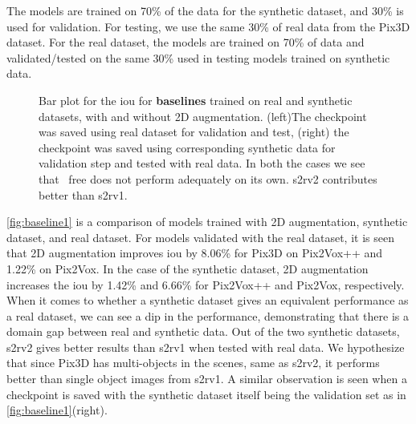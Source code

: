 The models are trained on 70\% of the data for the synthetic dataset, and 30\% is used for validation.
For testing, we use the same 30\% of real data from the Pix3D dataset.
For the real dataset, the models are trained on 70\% of data and validated/tested on the same 30\% used in testing models trained on synthetic data.

\begin{figure}[ht]
    \centering
    \resizebox{0.49\linewidth}{0.5\linewidth}{}
    \resizebox{0.49\linewidth}{0.5\linewidth}{}
    \caption{Bar plot for the \gls{iou}  for \textbf{baselines} trained on real and synthetic datasets, with and without 2D augmentation.
        (left)The checkpoint was saved using real dataset for validation and test, (right) the checkpoint was saved using corresponding synthetic data for validation step and tested with real data.
        In both the cases we see that ~\gls{free} does not perform adequately on its own. \gls{s2rv2} contributes better than \gls{s2rv1}.}
    \label{fig:baseline1}
\end{figure}

\autoref{fig:baseline1} is a comparison of models trained with 2D augmentation, synthetic dataset, and real dataset.
For models validated with the real dataset, it is seen that 2D augmentation improves \gls{iou}  by 8.06\% for Pix3D on Pix2Vox++ and 1.22\% on Pix2Vox.
In the case of the synthetic dataset, 2D augmentation increases the \gls{iou}  by 1.42\% and 6.66\% for Pix2Vox++ and Pix2Vox, respectively.
When it comes to whether a synthetic dataset gives an equivalent performance as a real dataset, we can see a dip in the performance, demonstrating that there is a domain gap between real and synthetic data.
Out of the two synthetic datasets, \gls{s2rv2} gives better results than \gls{s2rv1} when tested with real data.
We hypothesize that since Pix3D has multi-objects in the scenes, same as \gls{s2rv2}, it performs better than single object images from \gls{s2rv1}.
A similar observation is seen when a checkpoint is saved with the synthetic dataset itself being the validation set as in \autoref{fig:baseline1}(right).


